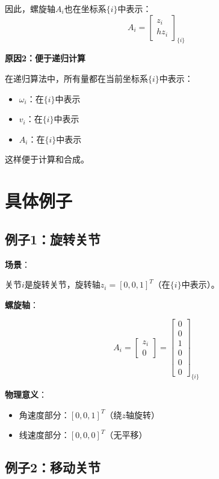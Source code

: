 \documentclass[12pt,a4paper]{article}
\begin{document}
因此，螺旋轴$A_i$也在坐标系$\{i\}$中表示：
\begin{equation}
A_i = \begin{bmatrix} z_i \\ h z_i \end{bmatrix}_{\{i\}}
\end{equation}

\textbf{原因2：便于递归计算}

在递归算法中，所有量都在当前坐标系$\{i\}$中表示：
\begin{itemize}
\item $\omega_i$：在$\{i\}$中表示
\item $v_i$：在$\{i\}$中表示
\item $A_i$：在$\{i\}$中表示
\end{itemize}

这样便于计算和合成。

\section{具体例子}

\subsection{例子1：旋转关节}

\textbf{场景}：

关节$i$是旋转关节，旋转轴$z_i = [0, 0, 1]^T$（在$\{i\}$中表示）。

\textbf{螺旋轴}：

\begin{equation}
A_i = \begin{bmatrix} z_i \\ 0 \end{bmatrix} = \begin{bmatrix} 0 \\ 0 \\ 1 \\ 0 \\ 0 \\ 0 \end{bmatrix}_{\{i\}}
\end{equation}

\textbf{物理意义}：
\begin{itemize}
\item 角速度部分：$[0, 0, 1]^T$（绕$z$轴旋转）
\item 线速度部分：$[0, 0, 0]^T$（无平移）
\end{itemize}

\subsection{例子2：移动关节}
\end{document}
